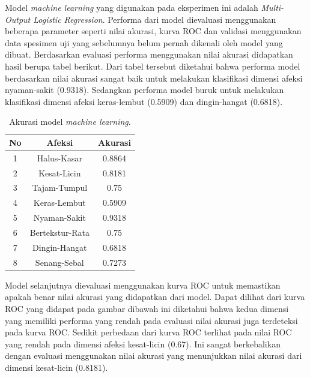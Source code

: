 \documentclass{Jurnal_kolo}
\begin{document}
\begin{multicols}{2}
	\indent Model \emph{machine learning} yang digunakan pada eksperimen ini adalah \emph{Multi-Output Logistic Regression}. Performa dari model dievaluasi menggunakan beberapa parameter seperti nilai akurasi, kurva ROC dan validasi menggunakan data spesimen uji yang sebelumnya belum pernah dikenali oleh model yang dibuat. Berdasarkan evaluasi performa menggunakan nilai akurasi didapatkan hasil berupa tabel berikut. Dari tabel tersebut diketahui bahwa performa model berdasarkan nilai akurasi sangat baik untuk melakukan klasifikasi dimensi afeksi nyaman-sakit (0.9318). Sedangkan performa model buruk untuk melakukan klasifikasi dimensi afeksi keras-lembut (0.5909) dan dingin-hangat (0.6818).\\
	
	\begin{table}[H]
		\centering
		\caption{Akurasi model \emph{machine learning}.}
		\label{acc1}
		\begin{tabular}{|c|c|c|}
			\hline
			No & Afeksi & Akurasi \\
			\hline
			1 & Halus-Kasar & 0.8864\\
			\hline
			2& Kesat-Licin & 0.8181 \\
			\hline
			3&Tajam-Tumpul&  0.75 \\
			\hline
			4& Keras-Lembut&0.5909\\
			\hline
			5&Nyaman-Sakit&0.9318\\
			\hline
			6&Bertekstur-Rata&0.75\\
			\hline
			7&Dingin-Hangat&0.6818\\
			\hline
			8&Senang-Sebal&0.7273\\
			\hline
		\end{tabular}
	\end{table}
	
		\indent Model selanjutnya dievaluasi menggunakan kurva ROC untuk memastikan apakah benar nilai akurasi yang didapatkan dari model. Dapat dilihat dari kurva ROC yang didapat pada gambar dibawah ini diketahui bahwa kedua dimensi yang memiliki performa yang rendah pada evaluasi nilai akurasi juga terdeteksi pada kurva ROC. Sedikit perbedaan dari kurva ROC terlihat pada nilai ROC yang rendah pada dimensi afeksi kesat-licin (0.67). Ini sangat berkebalikan dengan evaluasi menggunakan nilai akurasi yang menunjukkan nilai akurasi dari dimensi kesat-licin (0.8181).\\
		

\end{multicols}
\end{document}
